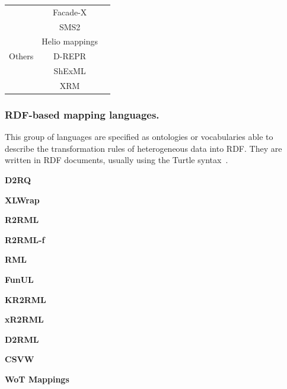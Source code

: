 \begin{table}[t]
\begin{tabular}{c|c|c}
                              & Facade-X        & \parencite{asprino2023sparql-anything,sparqlanything}\\ \cline{2-3}
                              & SMS2            & \parencite{sms2}\\ \hline
\multirow{3}{*}{Others}       & Helio mappings  & \parencite{cimmino2022helio}\\ \cline{2-3} 
                              & D-REPR          & \parencite{Vu2019d-repr}\\ \cline{2-3} 
                              & ShExML          & \parencite{Garcia-Gonzalez2020shexml,shexml}\\ \cline{2-3}
                              & XRM             & \parencite{xrm}\\ \hline
\end{tabular}
\end{table}

\subsubsection{RDF-based mapping languages.} 

This group of languages are specified as ontologies or vocabularies able to describe the transformation rules of heterogeneous data into RDF. They are written in RDF documents, usually using the Turtle syntax~\parencite{turtle}. 



\noindent\textbf{D2RQ}~\parencite{bizer2004d2rq}

\noindent\textbf{XLWrap}~\parencite{langegger2009xlwrap}

\noindent\textbf{R2RML}~\parencite{das2012r2rml}

\noindent\textbf{R2RML-f}~\parencite{debruyne2016r2rmlf}

\noindent\textbf{RML}~\parencite{Dimou2014rml}

\noindent\textbf{FunUL}~\parencite{junior2016funul}

\noindent\textbf{KR2RML}~\parencite{slepicka2015kr2rml}

\noindent\textbf{xR2RML}~\parencite{michel2015xr2rml}

\noindent\textbf{D2RML}~\parencite{chortaras2018d2rml}

\noindent\textbf{CSVW}~\parencite{Tennison2015csvw}

\noindent\textbf{WoT Mappings}~\parencite{cimmino2020ewot}

